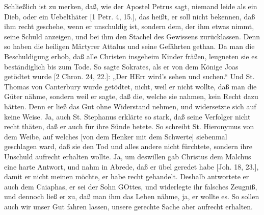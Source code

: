 Schließlich ist zu merken, daß, wie der Apostel Petrus sagt, niemand leide als ein Dieb, oder ein Uebelthäter [1 Petr. 4, 15.], das heißt, er soll nicht bekennen, daß ihm recht geschehe, wenn er unschuldig ist, sondern dem, der ihm etwas nimmt, seine Schuld anzeigen, und bei ihm den Stachel des Gewissens zurücklassen. Denn so haben die heiligen Märtyrer Attalus und seine Gefährten gethan. Da man die Beschuldigung erhob, daß alle Christen insgeheim Kinder fräßen, leugneten sie es beständiglich bis zum Tode. So sagte Sokrates, als er von dem Könige Joas getödtet wurde [2 Chron. 24, 22.]: „Der HErr wird’s sehen und suchen.“ Und St. Thomas von Canterbury wurde getödtet, nicht, weil er nicht wollte, daß man die Güter nähme, sondern weil er sagte, daß die, welche sie nahmen, kein Recht dazu hätten. Denn er ließ das Gut ohne Widerstand nehmen, und widersetzte sich auf keine Weise. Ja, auch St. Stephanus erklärte so stark, daß seine Verfolger nicht recht thäten, daß er auch für ihre Sünde betete. So schreibt St. Hieronymus von dem Weibe, auf welches [von dem Henker mit dem Schwerte] siebenmal geschlagen ward, daß sie den Tod und alles andere nicht fürchtete, sondern ihre Unschuld aufrecht erhalten wollte. Ja, um deswillen gab Christus dem Malchus eine harte Antwort, und nahm in Abrede, daß er übel geredet habe [Joh. 18, 23.], damit er
nicht meinen möchte, er habe recht gehandelt. Deshalb antwortete er auch dem Caiaphas, er sei der Sohn GOttes, und widerlegte ihr falsches Zeugniß, und dennoch ließ er zu, daß man ihm das Leben nähme, ja, er wollte es. So sollen auch wir unser Gut fahren lassen, unsere gerechte Sache aber aufrecht erhalten.

